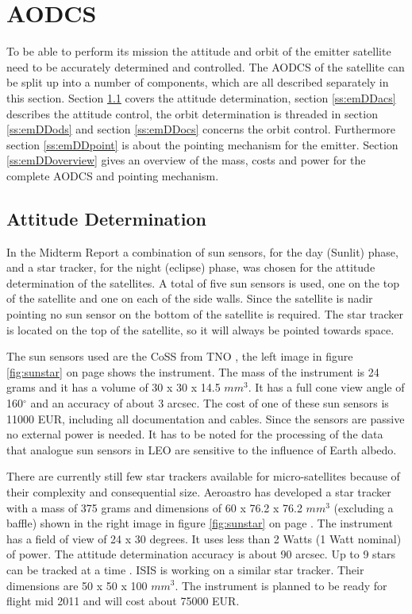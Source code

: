 \section{\acl{AODCS}}
\label{emDDadcs}
To be able to perform its mission the attitude and orbit of the emitter satellite need to be accurately determined and controlled. The \ac{AODCS} of the satellite can be split up into a number of components, which are all described separately in this section. Section \ref{ss:emDDads} covers the attitude determination, section \ref{ss:emDDacs} describes the attitude control, the orbit determination is threaded in section \ref{ss:emDDods} and section \ref{ss:emDDocs} concerns the orbit control. Furthermore section \ref{ss:emDDpoint} is about the pointing mechanism for the emitter. Section \ref{ss:emDDoverview} gives an overview of the mass, costs and power for the complete \ac{AODCS} and pointing mechanism.

\subsection{Attitude Determination}
\label{ss:emDDads}
In the Midterm Report \cite{midterm} a combination of sun sensors, for the day (Sunlit) phase, and a star tracker, for the night (eclipse) phase, was chosen for the attitude determination of the satellites. A total of five sun sensors is used, one on the top of the satellite and one on each of the side walls. Since the satellite is nadir pointing no sun sensor on the bottom of the satellite is required. The star tracker is located on the top of the satellite, so it will always be pointed towards space.

The sun sensors used are the \ac{CoSS} from TNO \cite{tnoweb}, the left image in figure \ref{fig:sunstar} on page \pageref{fig:sunstar} shows the instrument. The mass of the instrument is 24 grams and it has a volume of 30 x 30 x 14.5 $mm^3$. It has a full cone view angle of 160${}^\circ$ and an accuracy of about 3 arcsec. The cost of one of these sun sensors is 11000 EUR, including all documentation and cables. Since the sensors are passive no external power is needed. It has to be noted for the processing of the data that analogue sun sensors in \ac{LEO} are sensitive to the influence of Earth albedo.

There are currently still few star trackers available for micro-satellites because of their complexity and consequential size. Aeroastro has developed a star tracker with a mass of 375 grams and dimensions of 60 x 76.2 x 76.2 $mm^3$ (excluding a baffle) shown in the right image in figure \ref{fig:sunstar} on page \pageref{fig:sunstar}. The instrument has a field of view of 24 x 30 degrees. It uses less than 2 Watts (1 Watt nominal) of power. The attitude determination accuracy is about 90 arcsec. Up to 9 stars can be tracked at a time \cite{aeromst}. \ac{ISIS} \cite{cubesatshop} is working on a similar star tracker. Their dimensions are 50 x 50 x 100 $mm^3$. The instrument is planned to be ready for flight mid 2011 and will cost about 75000 EUR. 


